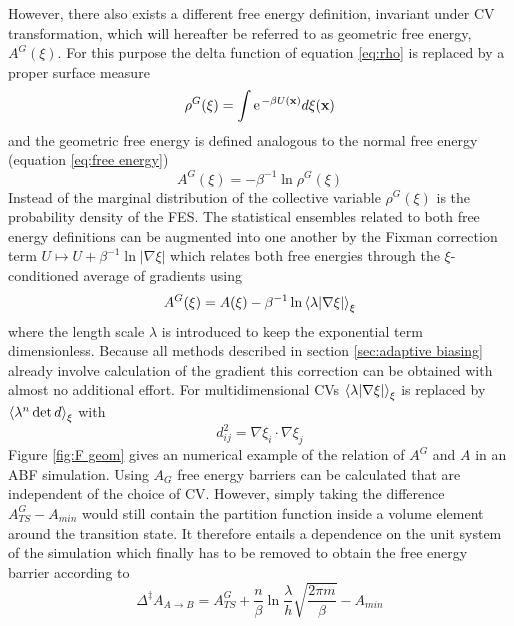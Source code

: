 However, there also exists a different free energy definition, invariant under CV transformation, which will hereafter be referred to as geometric free energy, $A^G(\xi)$.\autocite{hartmann2011two}
For this purpose the delta function of equation \ref{eq:rho} is replaced by a proper surface measure
\begin{equation}
  \rho^G (\xi) = \int \e^{-\beta U(\textbf{x})} d\xi(\textbf{x})
\end{equation}
and the geometric free energy is defined analogous to the normal free energy (equation \ref{eq:free energy})
\begin{equation}
  A^G(\xi) = -\beta^{-1}\ln \rho^G(\xi)
\end{equation}
Instead of the marginal distribution of the collective variable $\rho^G(\xi)$ is the probability density of the FES.
The statistical ensembles related to both free energy definitions can be augmented into one another by the Fixman correction term $U \mapsto U + \beta^{-1}\ln |\nabla \xi|$ which relates both free energies through the $\xi$-conditioned average of gradients using
\begin{equation}
  A^G(\xi) = A(\xi) - \beta^{-1}\ln\braket{\lambda |\nabla \xi|}_\xi
  \label{eq:f geom}
\end{equation}
where the length scale $\lambda$ is introduced to keep the exponential term dimensionless. Because all methods described in section \ref{sec:adaptive biasing} already involve calculation of the gradient this correction can be obtained with almost no additional effort.\autocite{bal2020free} For multidimensional CVs $\braket{\lambda|\nabla\xi|}_\xi$ is replaced by $\braket{\lambda^n \det d}_\xi$ with
\begin{equation}
  d^2_{ij} = \nabla \xi_i \cdot \nabla \xi_j
\end{equation}
Figure \ref{fig:F geom} gives an numerical example of the relation of $A^G$ and $A$ in an ABF simulation.
Using $A_G$ free energy barriers can be calculated that are independent of the choice of CV.
However, simply taking the difference $A_{TS}^G-A_{min}$ would still contain the partition function inside a volume element around the transition state.\autocite{bal2020free}
It therefore entails a dependence on the unit system of the simulation which finally has to be removed to obtain the free energy barrier according to
\begin{equation}
  \Delta^\ddagger A_{A\rightarrow B} = A_{TS}^G + \frac{n}{\beta}\ln \frac{\lambda}{h}\sqrt{\frac{2 \pi m}{\beta}}-A_{min}
\end{equation}
